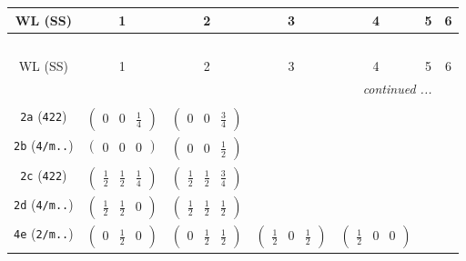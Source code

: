 \documentclass[fleqn,9pt,landscape]{jsarticle}
\begin{document}
\begin{center}
\renewcommand{\arraystretch}{1.2}
\begin{longtable}{ccccccc}
 \hline \hline
WL (SS) & 1 & 2 & 3 & 4 & 5 & 6 \\ \hline \endfirsthead

\multicolumn{6}{l}{\tablename\ \thetable{}} \\
 \hline \hline
WL (SS) & 1 & 2 & 3 & 4 & 5 & 6 \\ \hline \endhead

 \hline \hline
\multicolumn{6}{r}{\footnotesize\it continued ...} \\ \endfoot

 \hline \hline
\multicolumn{6}{r}{} \\ \endlastfoot

{\tt 2a} ({\tt 422}) & $ \begin{pmatrix} 0 & 0 & \frac{1}{4} \end{pmatrix} $ & $ \begin{pmatrix} 0 & 0 & \frac{3}{4} \end{pmatrix} $ & $  $ & $  $ & $  $ & $  $ \\ \hline
{\tt 2b} ({\tt 4/m..}) & $ \begin{pmatrix} 0 & 0 & 0 \end{pmatrix} $ & $ \begin{pmatrix} 0 & 0 & \frac{1}{2} \end{pmatrix} $ & $  $ & $  $ & $  $ & $  $ \\ \hline
{\tt 2c} ({\tt 422}) & $ \begin{pmatrix} \frac{1}{2} & \frac{1}{2} & \frac{1}{4} \end{pmatrix} $ & $ \begin{pmatrix} \frac{1}{2} & \frac{1}{2} & \frac{3}{4} \end{pmatrix} $ & $  $ & $  $ & $  $ & $  $ \\ \hline
{\tt 2d} ({\tt 4/m..}) & $ \begin{pmatrix} \frac{1}{2} & \frac{1}{2} & 0 \end{pmatrix} $ & $ \begin{pmatrix} \frac{1}{2} & \frac{1}{2} & \frac{1}{2} \end{pmatrix} $ & $  $ & $  $ & $  $ & $  $ \\ \hline
{\tt 4e} ({\tt 2/m..}) & $ \begin{pmatrix} 0 & \frac{1}{2} & 0 \end{pmatrix} $ & $ \begin{pmatrix} 0 & \frac{1}{2} & \frac{1}{2} \end{pmatrix} $ & $ \begin{pmatrix} \frac{1}{2} & 0 & \frac{1}{2} \end{pmatrix} $ & $ \begin{pmatrix} \frac{1}{2} & 0 & 0 \end{pmatrix} $ & $  $ & $  $ \\ \hline

\end{longtable}
\end{center}
\end{document}
